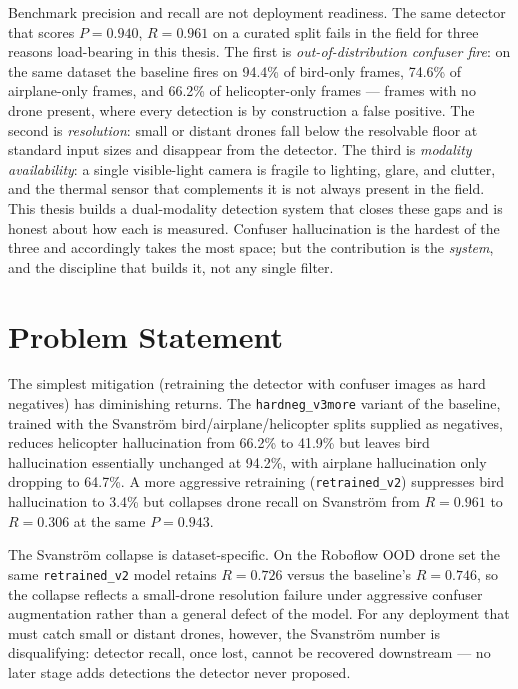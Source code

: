 Benchmark precision and recall are not deployment readiness. The same detector that scores $P=0.940$, $R=0.961$ on a curated split fails in the field for three reasons load-bearing in this thesis. The first is \emph{out-of-distribution confuser fire}: on the same dataset the baseline fires on 94.4\% of bird-only frames, 74.6\% of airplane-only frames, and 66.2\% of helicopter-only frames --- frames with no drone present, where every detection is by construction a false positive. The second is \emph{resolution}: small or distant drones fall below the resolvable floor at standard input sizes and disappear from the detector. The third is \emph{modality availability}: a single visible-light camera is fragile to lighting, glare, and clutter, and the thermal sensor that complements it is not always present in the field. This thesis builds a dual-modality detection system that closes these gaps and is honest about how each is measured. Confuser hallucination is the hardest of the three and accordingly takes the most space; but the contribution is the \emph{system}, and the discipline that builds it, not any single filter.

\section{Problem Statement}

The simplest mitigation (retraining the detector with confuser images as hard negatives) has diminishing returns. The \texttt{hardneg\_v3more} variant of the baseline, trained with the Svanstr\"om bird/airplane/helicopter splits supplied as negatives, reduces helicopter hallucination from 66.2\% to 41.9\% but leaves bird hallucination essentially unchanged at 94.2\%, with airplane hallucination only dropping to 64.7\%. A more aggressive retraining (\texttt{retrained\_v2}) suppresses bird hallucination to 3.4\% but collapses drone recall on Svanstr\"om from $R=0.961$ to $R=0.306$ at the same $P=0.943$.

The Svanstr\"om collapse is dataset-specific. On the Roboflow OOD drone set the same \texttt{retrained\_v2} model retains $R=0.726$ versus the baseline's $R=0.746$, so the collapse reflects a small-drone resolution failure under aggressive confuser augmentation rather than a general defect of the model. For any deployment that must catch small or distant drones, however, the Svanstr\"om number is disqualifying: detector recall, once lost, cannot be recovered downstream --- no later stage adds detections the detector never proposed.

